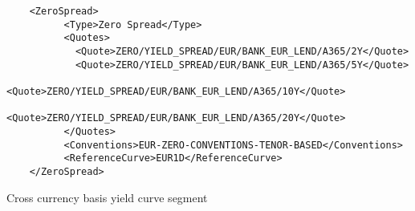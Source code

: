 \begin{listing}[H]
\begin{verbatim}
    <ZeroSpread>
          <Type>Zero Spread</Type>
          <Quotes>
            <Quote>ZERO/YIELD_SPREAD/EUR/BANK_EUR_LEND/A365/2Y</Quote>
            <Quote>ZERO/YIELD_SPREAD/EUR/BANK_EUR_LEND/A365/5Y</Quote>
            <Quote>ZERO/YIELD_SPREAD/EUR/BANK_EUR_LEND/A365/10Y</Quote>
            <Quote>ZERO/YIELD_SPREAD/EUR/BANK_EUR_LEND/A365/20Y</Quote>
          </Quotes>
          <Conventions>EUR-ZERO-CONVENTIONS-TENOR-BASED</Conventions>
          <ReferenceCurve>EUR1D</ReferenceCurve>
    </ZeroSpread>
\end{verbatim}
\caption{Cross currency basis yield curve segment}
\label{lst:zero_spread_segment}
\end{listing}
